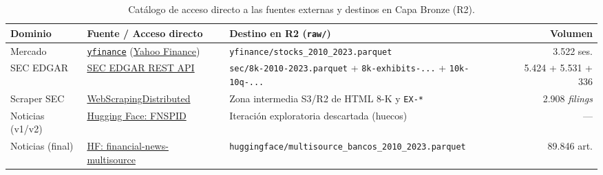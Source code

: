 \begin{table}[H]
    \centering
    \caption{Catálogo de acceso directo a las fuentes externas y destinos en Capa Bronze (R2).}
    \label{tab:fuentes_bronze}
    \footnotesize
    \begin{tabularx}{\textwidth}{@{}l >{\raggedright\arraybackslash}p{4.3cm} >{\raggedright\arraybackslash}X r@{}}
        \toprule
        \textbf{Dominio} & \textbf{Fuente / Acceso directo} & \textbf{Destino en R2 (\texttt{raw/})} & \textbf{Volumen} \\
        \midrule
        Mercado & \href{https://github.com/ranaroussi/yfinance}{\texttt{yfinance}} (\href{https://finance.yahoo.com/}{Yahoo Finance})~\cite{aroussi_yfinance} & \texttt{yfinance/\allowbreak stocks\_2010\_2023.parquet} & 3.522 ses. \\
        SEC EDGAR & \href{https://www.sec.gov/search-filings/edgar-application-programming-interfaces}{SEC EDGAR REST API}~\cite{sec_edgar_api} & \texttt{sec/8k-2010-2023.parquet} + \texttt{8k-exhibits-...} + \texttt{10k-10q-...} & 5.424 + 5.531 + 336 \\
        Scraper SEC & \href{https://github.com/ArturoCarrilloJimenez/WebScrapingDistributed}{WebScrapingDistributed}~\cite{carrillo2026webscrapingdistributed} & Zona intermedia S3/R2 de HTML 8-K y \texttt{EX-*} & 2.908 \textit{filings} \\
        Noticias (v1/v2) & \href{https://huggingface.co/datasets/Zihan1004/FNSPID}{Hugging Face: FNSPID}~\cite{dong2024fnspid} & Iteración exploratoria descartada (huecos) & --- \\
        Noticias (final) & \href{https://huggingface.co/datasets/Brianferrell787/financial-news-multisource}{HF: financial-news-multisource}~\cite{ferrell_multisource} & \texttt{huggingface/\allowbreak multisource\_\allowbreak bancos\_2010\_2023.parquet} & 89.846 art. \\
        \bottomrule
    \end{tabularx}
\end{table}

